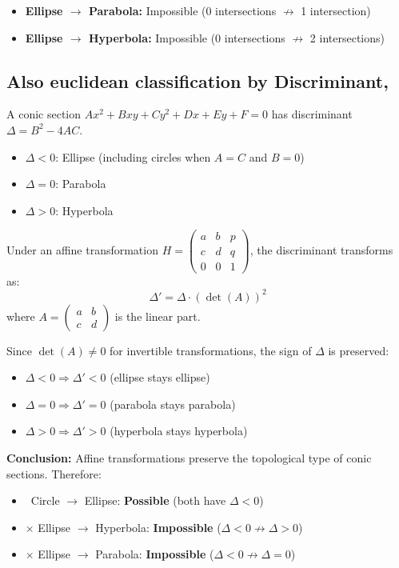 \documentclass[12pt]{article}
\begin{document}
\begin{itemize}
    \item \textbf{Ellipse $\rightarrow$ Parabola:} Impossible (0 intersections $\not\rightarrow$ 1 intersection)
    \item \textbf{Ellipse $\rightarrow$ Hyperbola:} Impossible (0 intersections $\not\rightarrow$ 2 intersections)
\end{itemize}

\subsection*{Also euclidean classification by Discriminant,}

A conic section $Ax^2 + Bxy + Cy^2 + Dx + Ey + F = 0$ has discriminant $\Delta = B^2 - 4AC$.

\begin{itemize}
    \item $\Delta < 0$: Ellipse (including circles when $A = C$ and $B = 0$)
    \item $\Delta = 0$: Parabola
    \item $\Delta > 0$: Hyperbola
\end{itemize}

Under an affine transformation $H = \begin{pmatrix} a & b & p \\ c & d & q \\ 0 & 0 & 1 \end{pmatrix}$, the discriminant transforms as:
\[
\Delta' = \Delta \cdot (\det(A))^2
\]
where $A = \begin{pmatrix} a & b \\ c & d \end{pmatrix}$ is the linear part.

Since $\det(A) \neq 0$ for invertible transformations, the sign of $\Delta$ is preserved:
\begin{itemize}
    \item $\Delta < 0 \Rightarrow \Delta' < 0$ (ellipse stays ellipse)
    \item $\Delta = 0 \Rightarrow \Delta' = 0$ (parabola stays parabola)  
    \item $\Delta > 0 \Rightarrow \Delta' > 0$ (hyperbola stays hyperbola)
\end{itemize}

\textbf{Conclusion:} Affine transformations preserve the topological type of conic sections. Therefore:
\begin{itemize}
    \item \checkmark\ Circle $\rightarrow$ Ellipse: \textbf{Possible} (both have $\Delta < 0$)
    \item $\times$ Ellipse $\rightarrow$ Hyperbola: \textbf{Impossible} ($\Delta < 0 \not\rightarrow \Delta > 0$)
    \item $\times$ Ellipse $\rightarrow$ Parabola: \textbf{Impossible} ($\Delta < 0 \not\rightarrow \Delta = 0$)
\end{itemize}
\end{document}
